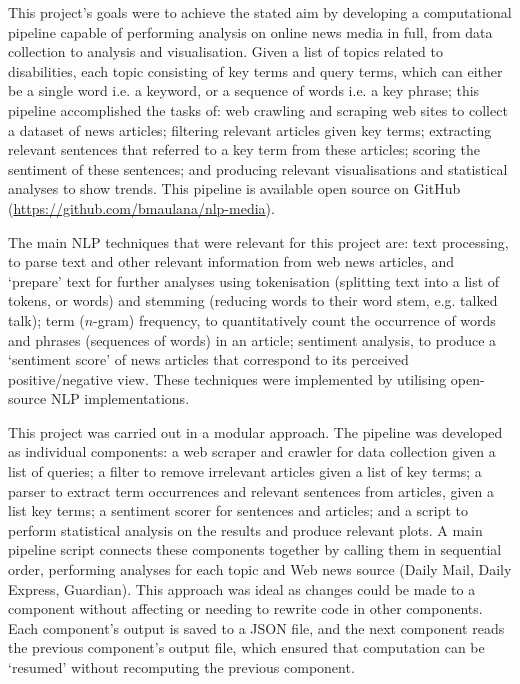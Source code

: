 \documentclass{report}
\begin{document}
This project's goals were to achieve the stated aim by developing a computational pipeline capable of performing analysis on online news media in full, from data collection to analysis and visualisation.
Given a list of topics related to disabilities, each topic consisting of key terms and query terms, which can either be a single word i.e. a keyword, or a sequence of words i.e. a key phrase;
this pipeline accomplished the tasks of: 
web crawling and scraping web sites to collect a dataset of news articles;
filtering relevant articles given key terms; 
extracting relevant sentences that referred to a key term from these articles;
scoring the sentiment of these sentences;
and producing relevant visualisations and statistical analyses to show trends.
This pipeline is available open source on GitHub (\url{https://github.com/bmaulana/nlp-media}).

The main NLP techniques that were relevant for this project are:
text processing, to parse text and other relevant information from web news articles, and `prepare' text for further analyses using tokenisation (splitting text into a list of tokens, or words) and stemming (reducing words to their word stem, e.g. talked \textrightarrow\space talk);
term ($n$-gram) frequency, to quantitatively count the occurrence of words and phrases (sequences of words) in an article;
sentiment analysis, to produce a `sentiment score' of news articles that correspond to its perceived positive/negative view.
These techniques were implemented by utilising open-source NLP implementations.

This project was carried out in a modular approach. The pipeline was developed as individual components: 
a web scraper and crawler for data collection given a list of queries; 
a filter to remove irrelevant articles given a list of key terms; 
a parser to extract term occurrences and relevant sentences from articles, given a list key terms; 
a sentiment scorer for sentences and articles; 
and a script to perform statistical analysis on the results and produce relevant plots. 
A main pipeline script connects these components together by calling them in sequential order, performing analyses for each topic and Web news source (Daily Mail, Daily Express, Guardian).
This approach was ideal as changes could be made to a component without affecting or needing to rewrite code in other components.
Each component's output is saved to a JSON \cite{rfc8259} file, and the next component reads the previous component's output file, which ensured that computation can be `resumed' without recomputing the previous component. %
\end{document}
